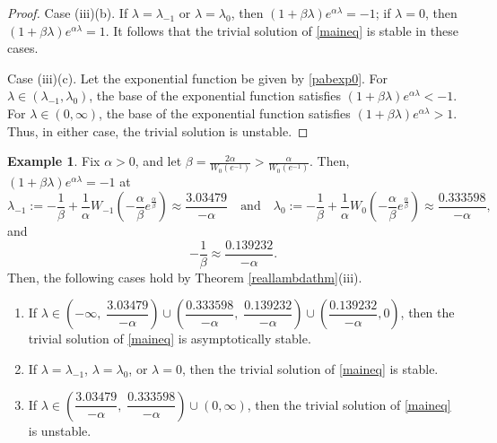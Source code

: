 \documentclass[12pt,reqno]{amsart}
\theoremstyle{plain}
\theoremstyle{definition}
\newtheorem{example}[theorem]{Example}
\numberwithin{equation}{section}
\numberwithin{theorem}{section}
\begin{document}
\begin{proof}
Case (iii)(b). If $\lambda=\lambda_{-1}$ or $\lambda=\lambda_{0}$, then $(1+\beta\lambda)e^{\alpha\lambda}=-1$; if $\lambda=0$, then $(1+\beta\lambda)e^{\alpha\lambda}=1$. It follows that the trivial solution of \eqref{maineq} is stable in these cases.

Case (iii)(c). Let the exponential function be given by \eqref{pabexp0}. For $\lambda\in\left(\lambda_{-1},\lambda_{0}\right)$, the base of the exponential function satisfies $(1+\beta\lambda)e^{\alpha\lambda}<-1$. For $\lambda\in\left(0,\infty\right)$, the base of the exponential function satisfies $(1+\beta\lambda)e^{\alpha\lambda}>1$. Thus, in either case, the trivial solution is unstable.  
\end{proof}


\begin{example}
Fix $\alpha>0$, and let $\beta=\frac{2\alpha}{W_0(e^{-1})}>\frac{\alpha}{W_0(e^{-1})}$. Then, $(1+\beta\lambda)e^{\alpha\lambda}=-1$ at 
 $$ \lambda_{-1}:=-\frac{1}{\beta}+\frac{1}{\alpha}W_{-1}\left(-\frac{\alpha}{\beta}e^{\frac{\alpha}{\beta}}\right)\approx\dfrac{3.03479}{-\alpha} \quad\text{and}\quad 
    \lambda_{0}:=-\frac{1}{\beta}+\frac{1}{\alpha}W_{0}\left(-\frac{\alpha}{\beta}e^{\frac{\alpha}{\beta}}\right)\approx\dfrac{0.333598}{-\alpha}, $$
and 
$$ -\frac{1}{\beta} \approx \frac{0.139232}{-\alpha}. $$
Then, the following cases hold by Theorem \ref{reallambdathm}(iii).
 \begin{enumerate}
   \item If $\lambda\in\left(-\infty,\; \dfrac{3.03479}{-\alpha}\right)\cup\left(\dfrac{0.333598}{-\alpha},\; \dfrac{0.139232}{-\alpha}\right)\cup\left(\dfrac{0.139232}{-\alpha},0\right)$, then the trivial solution of \eqref{maineq} is asymptotically stable. 
   \item If $\lambda=\lambda_{-1}$, $\lambda=\lambda_{0}$, or $\lambda=0$, then the trivial solution of \eqref{maineq} is stable.
   \item If $\lambda\in\left(\dfrac{3.03479}{-\alpha},\;\dfrac{0.333598}{-\alpha}\right)\cup(0,\infty)$, 
	       then the trivial solution of \eqref{maineq} is unstable.
 \end{enumerate}
\end{example}

\end{document}
